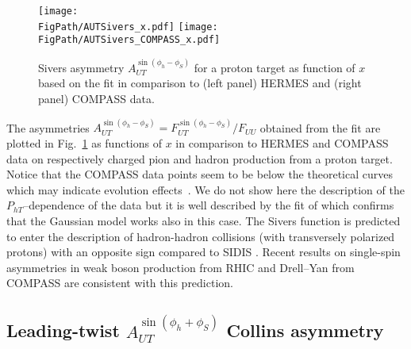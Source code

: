 \documentclass[a4paper,11pt]{article}
\newcommand{\bp}[1]{{\color[rgb]{0,0.65,0.35}#1}}
\newcommand*{\FigPath}{./figs}%
\begin{document}
\begin{figure}[t!]
\centering
\texttt{[image: \\FigPath/AUTSivers\_x.pdf]}  \hspace{5mm}
\texttt{[image: \\FigPath/AUTSivers\_COMPASS\_x.pdf]}
\caption{\label{aut_f1t_jlab} Sivers asymmetry
	$A_{UT}^{\sin(\phi_h-\phi_S)}$ for a proton target as function of $ x $
	based on the fit \cite{Anselmino:2011gs} in comparison to
	(left panel) HERMES \cite{Airapetian:2009ae}
	and (right panel) COMPASS  \cite{Adolph:2012sp} data.}
\end{figure}

The asymmetries $A_{UT}^{\sin(\phi_h-\phi_S)}= F_{UT}^{\sin(\phi_h-\phi_S)}/F_{UU}$
obtained from the fit \cite{Anselmino:2011gs}
are plotted in Fig.~\ref{aut_f1t_jlab} as functions of $x$ in comparison
to HERMES \cite{Airapetian:2009ae} and COMPASS \cite{Adolph:2012sp} data
on respectively charged pion and hadron production from a proton target.
	Notice that the COMPASS data points seem to be below the
	theoretical curves which may indicate evolution
	effects~\cite{Aybat:2011ta,Anselmino:2012aa}.
We do not show here the description of the $P_{hT}$--dependence of the
data but it is well described by the fit of \cite{Anselmino:2011gs}
which confirms that the Gaussian model works also in this case.
\bp{The Sivers function is predicted to enter the description of hadron-hadron 
collisions (with transversely polarized protons) with an opposite sign 
compared to SIDIS \cite{Collins:2002kn,Brodsky:2002cx,Brodsky:2002rv}.
Recent results on single-spin asymmetries in weak boson production 
from RHIC \cite{Adamczyk:2015gyk} and Drell--Yan from COMPASS 
\cite{Aghasyan:2017jop,Parsamyan:2018zju} are consistent 
with this prediction.}



\subsection{\boldmath Leading-twist $A_{UT}^{\sin(\phi_h+\phi_S)}$ Collins asymmetry}
\label{Sec-5.4:Collins-basis}
\end{document}
